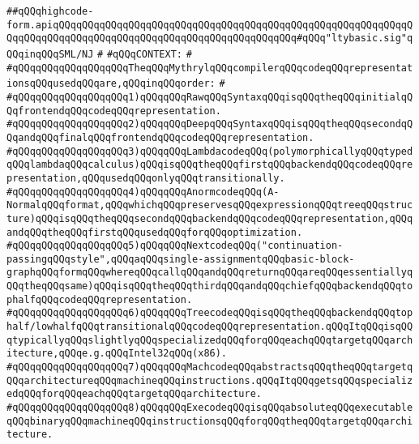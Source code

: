 \label{src/lib/compiler/back/top/highcode/highcode-form.api}
\verb|##qQQqhighcode-form.apiqQQqqQQqqQQqqQQqqQQqqQQqqQQqqQQqqQQqqQQqqQQqqQQqqQQqqQQqqQQqqQQqqQQqqQQqqQQqqQQqqQQqqQQqqQQqqQQqqQQqqQQqqQQqqQQq#qQQq"ltybasic.sig"qQQqinqQQqSML/NJ|\newline
\verb|#|\newline
\verb|#qQQqCONTEXT:|\newline
\verb|#|\newline
\verb|#qQQqqQQqqQQqqQQqqQQqTheqQQqMythrylqQQqcompilerqQQqcodeqQQqrepresentationsqQQqusedqQQqare,qQQqinqQQqorder:|\newline
\verb|#|\newline
\verb|#qQQqqQQqqQQqqQQqqQQq1)qQQqqQQqRawqQQqSyntaxqQQqisqQQqtheqQQqinitialqQQqfrontendqQQqcodeqQQqrepresentation.|\newline
\verb|#qQQqqQQqqQQqqQQqqQQq2)qQQqqQQqDeepqQQqSyntaxqQQqisqQQqtheqQQqsecondqQQqandqQQqfinalqQQqfrontendqQQqcodeqQQqrepresentation.|\newline
\verb|#qQQqqQQqqQQqqQQqqQQq3)qQQqqQQqLambdacodeqQQq(polymorphicallyqQQqtypedqQQqlambdaqQQqcalculus)qQQqisqQQqtheqQQqfirstqQQqbackendqQQqcodeqQQqrepresentation,qQQqusedqQQqonlyqQQqtransitionally.|\newline
\verb|#qQQqqQQqqQQqqQQqqQQq4)qQQqqQQqAnormcodeqQQq(A-NormalqQQqformat,qQQqwhichqQQqpreservesqQQqexpressionqQQqtreeqQQqstructure)qQQqisqQQqtheqQQqsecondqQQqbackendqQQqcodeqQQqrepresentation,qQQqandqQQqtheqQQqfirstqQQqusedqQQqforqQQqoptimization.|\newline
\verb|#qQQqqQQqqQQqqQQqqQQq5)qQQqqQQqNextcodeqQQq("continuation-passingqQQqstyle",qQQqaqQQqsingle-assignmentqQQqbasic-block-graphqQQqformqQQqwhereqQQqcallqQQqandqQQqreturnqQQqareqQQqessentiallyqQQqtheqQQqsame)qQQqisqQQqtheqQQqthirdqQQqandqQQqchiefqQQqbackendqQQqtophalfqQQqcodeqQQqrepresentation.|\newline
\verb|#qQQqqQQqqQQqqQQqqQQq6)qQQqqQQqTreecodeqQQqisqQQqtheqQQqbackendqQQqtophalf/lowhalfqQQqtransitionalqQQqcodeqQQqrepresentation.qQQqItqQQqisqQQqtypicallyqQQqslightlyqQQqspecializedqQQqforqQQqeachqQQqtargetqQQqarchitecture,qQQqe.g.qQQqIntel32qQQq(x86).|\newline
\verb|#qQQqqQQqqQQqqQQqqQQq7)qQQqqQQqMachcodeqQQqabstractsqQQqtheqQQqtargetqQQqarchitectureqQQqmachineqQQqinstructions.qQQqItqQQqgetsqQQqspecializedqQQqforqQQqeachqQQqtargetqQQqarchitecture.|\newline
\verb|#qQQqqQQqqQQqqQQqqQQq8)qQQqqQQqExecodeqQQqisqQQqabsoluteqQQqexecutableqQQqbinaryqQQqmachineqQQqinstructionsqQQqforqQQqtheqQQqtargetqQQqarchitecture.|\newline

